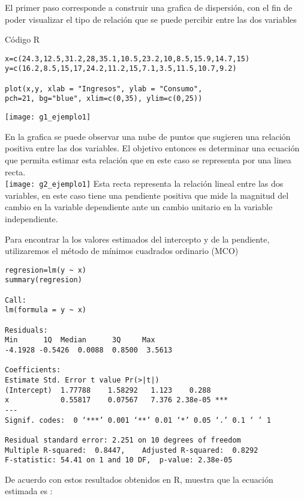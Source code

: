 \documentclass[base=hide,12pt]{elegantbook}
\begin{document}
El primer paso corresponde a construir una grafica de dispersión, con el fin de poder visualizar el tipo de relación que se puede percibir entre las dos variables

\begin{Box3}{Código R}
\begin{verbatim} 	
x=c(24.3,12.5,31.2,28,35.1,10.5,23.2,10,8.5,15.9,14.7,15)
y=c(16.2,8.5,15,17,24.2,11.2,15,7.1,3.5,11.5,10.7,9.2)

plot(x,y, xlab = "Ingresos", ylab = "Consumo",
pch=21, bg="blue", xlim=c(0,35), ylim=c(0,25))
\end{verbatim}
\end{Box3}	
\texttt{[image: g1\_ejemplo1]}

En la grafica se puede observar una nube de  puntos que sugieren una relación positiva entre las dos  variables.  El objetivo entonces es determinar una ecuación que permita estimar esta relación que en este caso se representa por una linea recta.\\


\texttt{[image: g2\_ejemplo1]}
Esta recta representa la relación lineal entre  las dos variables, en este caso tiene una pendiente positiva que mide la magnitud del cambio en la variable dependiente ante un cambio unitario en la variable independiente.

Para encontrar la los valores estimados del intercepto y de la pendiente, utilizaremos el método de mínimos cuadrados ordinario (MCO) 

\begin{Box3}{}
	\begin{verbatim}
regresion=lm(y ~ x)
summary(regresion)

Call:
lm(formula = y ~ x)

Residuals:
Min      1Q  Median      3Q     Max 
-4.1928 -0.5426  0.0088  0.8500  3.5613 

Coefficients:
Estimate Std. Error t value Pr(>|t|)    
(Intercept)  1.77788    1.58292   1.123    0.288    
x            0.55817    0.07567   7.376 2.38e-05 ***
---
Signif. codes:  0 ‘***’ 0.001 ‘**’ 0.01 ‘*’ 0.05 ‘.’ 0.1 ‘ ’ 1

Residual standard error: 2.251 on 10 degrees of freedom
Multiple R-squared:  0.8447,	Adjusted R-squared:  0.8292 
F-statistic: 54.41 on 1 and 10 DF,  p-value: 2.38e-05
\end{verbatim}
\end{Box3}


De acuerdo con estos resultados obtenidos en R, muestra que la ecuación estimada es :
\end{document}

